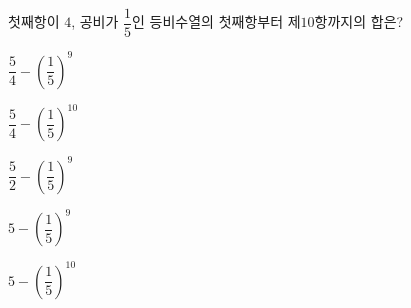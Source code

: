 첫째항이 $4$, 공비가 $\dfrac{1}{5}$인 등비수열의 첫째항부터 제$10$항까지의 합은?
\begin{choices32}{\rule[-3ex]{0pt}{8ex}$\dfrac{5}{4}-\left(\dfrac{1}{5}\right)^{9}$}{\rule[-3ex]{0pt}{8ex}$\dfrac{5}{4}-\left(\dfrac{1}{5}\right)^{10}$}{\rule[-3ex]{0pt}{8ex}$\dfrac{5}{2}-\left(\dfrac{1}{5}\right)^{9}$}{\rule[-3ex]{0pt}{8ex}$5-\left(\dfrac{1}{5}\right)^{9}$}{\rule[-3ex]{0pt}{8ex}$5-\left(\dfrac{1}{5}\right)^{10}$}\end{choices32}
